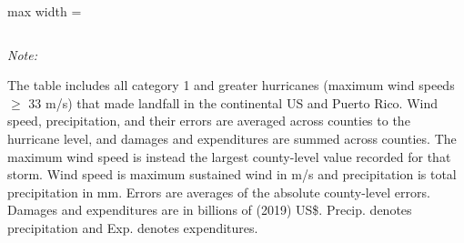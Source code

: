 \begin{table}
\begin{adjustbox}{max width = \textwidth}
\begin{threeparttable}
\begin{tabular}[t]{lcccccccc}
\bottomrule
\end{tabular}
\begin{tablenotes}
\small
\item \textit{Note: } 
\item The table includes all category 1 and greater hurricanes (maximum wind speeds $\geq$ 33 m/s) that made landfall in the continental US and Puerto Rico. Wind speed, precipitation, and their errors are averaged across counties to the hurricane level, and damages and expenditures are summed across counties. The maximum wind speed is instead the largest county-level value recorded for that storm. Wind speed is maximum sustained wind in m/s and precipitation is total precipitation in mm. Errors are averages of the absolute county-level errors. Damages and expenditures are in billions of (2019) US\$. Precip. denotes precipitation and Exp. denotes expenditures.
\end{tablenotes}
\end{threeparttable}
\end{adjustbox}
\end{table}
